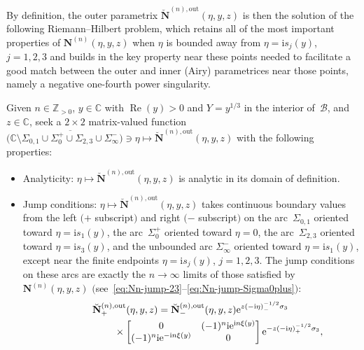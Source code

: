 By definition, the outer parametrix $\breve{\mathbf{N}}^{(n),\mathrm{out}}(\eta,y,z)$ is then the solution of the following Riemann--Hilbert problem, which retains all of the most important properties of $\mathbf{N}^{(n)}(\eta,y,z)$ when $\eta$ is bounded away from $\eta=\mathrm{i} s_j(y)$, $j=1,2,3$ and builds in the key property near these points needed to facilitate a good match between the outer and inner (Airy) parametrices near those points, namely a negative one-fourth power singularity.
\begin{rhp}\label{rhp:genus1outer}
Given $n\in\mathbb{Z}_{>0}$, $y\in\mathbb{C}$ with $\operatorname{Re}(y)>0$ and $Y=y^{1/3}$ in the interior of~$\mathcal{B}$, and $z\in\mathbb{C}$, seek a $2\times 2$ matrix-valued function $\bigl(\mathbb{C}\setminus \overline{\Sigma_{0,1}\cup\Sigma_0^+\cup\Sigma_{2,3}\cup\Sigma_\infty^-}\bigr)\ni\eta\mapsto\breve{\mathbf{N}}^{(n),\mathrm{out}}(\eta,y,z)$ with the following properties:
\begin{itemize}\itemsep=0pt
\item[] Analyticity: $\eta\mapsto\breve{\mathbf{N}}^{(n),\mathrm{out}}(\eta,y,z)$ is analytic in its domain of definition.
\item[]Jump conditions: $\eta\mapsto\breve{\mathbf{N}}^{(n),\mathrm{out}}(\eta,y,z)$ takes continuous boundary values from the left $(+$ subscript$)$ and right $(-$ subscript$)$ on the arc~$\Sigma_{0,1}$ oriented toward $\eta=\mathrm{i} s_1(y)$, the arc~$\Sigma_0^+$ oriented toward $\eta=0$, the arc~$\Sigma_{2,3}$ oriented toward $\eta=\mathrm{i} s_3(y)$, and the unbounded arc $\Sigma_{\infty}^-$ oriented toward $\eta=\mathrm{i} s_1(y)$, except near the finite endpoints $\eta=\mathrm{i} s_j(y)$, $j=1,2,3$. The jump conditions on these arcs are exactly the $n\to\infty$ limits of those satisfied by~$\mathbf{N}^{(n)}(\eta,y,z)$ $($see~\eqref{eq:Nn-jump-23}--\eqref{eq:Nn-jump-Sigma0plus}$)$:
\begin{gather}
 \breve{\mathbf{N}}^{(n),\mathrm{out}}_+(\eta,y,z)
=\breve{\mathbf{N}}^{(n),\mathrm{out}}_-(\eta,y,z)\mathrm{e}^{z(-\mathrm{i}\eta)^{-1/2}_-\sigma_3}\nonumber \\
\hphantom{\breve{\mathbf{N}}^{(n),\mathrm{out}}_+(\eta,y,z)=}{}\times \begin{bmatrix}0 & (-1)^n\mathrm{i}\mathrm{e}^{\mathrm{i} n\xi(y)} \nonumber \\
(-1)^n\mathrm{i}\mathrm{e}^{-\mathrm{i} n\xi(y)} & 0\end{bmatrix}\mathrm{e}^{-z(-\mathrm{i}\eta)^{-1/2}_+\sigma_3}, \qquad

\end{gather}
\end{itemize}
\end{rhp}
